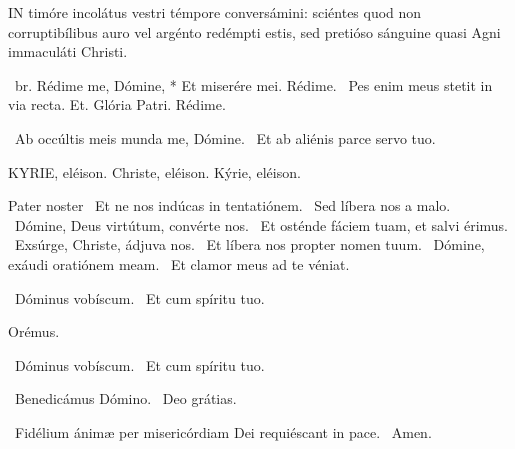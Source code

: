 


\lettrine[lines=2]{I}{N} timóre incolátus vestri témpore conversámini: sciéntes quod non corruptibílibus auro vel argénto redémpti estis, sed pretióso sánguine quasi Agni immaculáti Christi.

\R\ br. Rédime me, Dómine, * Et miserére mei. Rédime. \V\ Pes enim meus stetit in via recta. Et. Glória Patri. Rédime.

\V\ Ab occúltis meis munda me, Dómine. \R\ Et ab aliénis parce servo tuo.



KYRIE, eléison. Christe, eléison. Kýrie, eléison.

Pater noster  \V\ Et ne nos indúcas in tentatiónem. \R\ Sed líbera nos a malo. \V\ Dómine, Deus virtútum, convérte nos. \R\ Et osténde fáciem tuam, et salvi érimus. \V\ Exsúrge, Christe, ádjuva nos. \R\ Et líbera nos propter nomen tuum. \V\ Dómine, exáudi oratiónem meam. \R\ Et clamor meus ad te véniat.


\V\ Dóminus vobíscum. \R\ Et cum spíritu tuo.

Orémus.



\V\ Dóminus vobíscum. \R\ Et cum spíritu tuo.

\V\ Benedicámus Dómino. \R\ Deo grátias.

\V\ Fidélium ánimæ per misericórdiam Dei requiéscant in pace. \R\ Amen.


